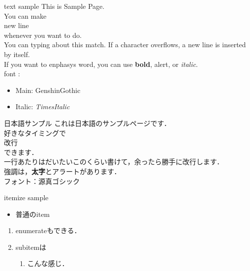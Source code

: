 \documentclass[aspectratio=1610,14pt]{beamer}
\begin{document}
\begin{frame}{text sample}
    This is Sample Page.\\
    You can make \\
    \alert{new line}\\
    whenever you want to do.\\
    You can typing about this match. If a character overflows, a new line is inserted by itself.\\
    If you want to enphasys word, you can use \textbf{bold}, \alert{alert}, or \textit{italic}. \\
    font :
    \begin{itemize}
        \item{Main: GenshinGothic}
        \item{Italic: \textit{TimesItalic}}
    \end{itemize}
\end{frame}

\begin{frame}{日本語サンプル}
    これは日本語のサンプルページです．\\
    好きなタイミングで\\
    \alert{改行}\\
    できます．\\
    一行あたりはだいたいこのくらい書けて，余ったら勝手に改行します．\\
    強調は，\textbf{太字}と\alert{アラート}があります．\\
    フォント：源真ゴシック
\end{frame}

\begin{frame}{itemize sample}
    \begin{itemize}
        \item{普通のitem}
            \begin{itemize}
            \end{itemize}
    \end{itemize}
    \begin{enumerate}
        \item{enumerateもできる．}
        \item{subitemは}
            \begin{enumerate}
                \item{こんな感じ．}
            \end{enumerate}
    \end{enumerate}
\end{frame}
\end{document}
